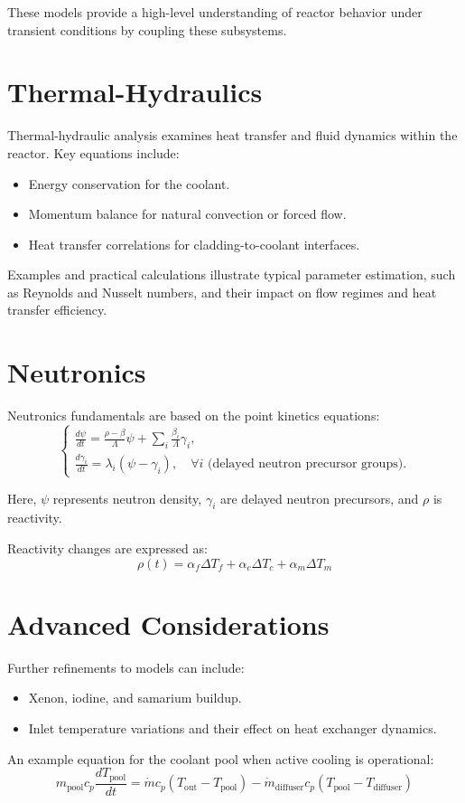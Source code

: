 These models provide a high-level understanding of reactor behavior under transient conditions by coupling these subsystems.

\section{Thermal-Hydraulics}

Thermal-hydraulic analysis examines heat transfer and fluid dynamics within the reactor. Key equations include:
\begin{itemize}
    \item Energy conservation for the coolant.
    \item Momentum balance for natural convection or forced flow.
    \item Heat transfer correlations for cladding-to-coolant interfaces.
\end{itemize}

Examples and practical calculations illustrate typical parameter estimation, such as Reynolds and Nusselt numbers, and their impact on flow regimes and heat transfer efficiency.

\section{Neutronics}

Neutronics fundamentals are based on the point kinetics equations:
\[
\begin{cases}
\frac{d\psi}{dt} = \frac{\rho - \beta}{\Lambda} \psi + \sum_i \frac{\beta_i}{\Lambda} \gamma_i, \\[10pt]
\frac{d\gamma_i}{dt} = \lambda_i (\psi - \gamma_i), \quad \forall i \text{ (delayed neutron precursor groups)}.
\end{cases}
\]

Here, $\psi$ represents neutron density, $\gamma_i$ are delayed neutron precursors, and $\rho$ is reactivity.

Reactivity changes are expressed as:
\[
\rho(t) = \alpha_f \Delta T_f + \alpha_c \Delta T_c + \alpha_m \Delta T_m
\]

\section{Advanced Considerations}

Further refinements to models can include:
\begin{itemize}
    \item Xenon, iodine, and samarium buildup.
    \item Inlet temperature variations and their effect on heat exchanger dynamics.
\end{itemize}
An example equation for the coolant pool when active cooling is operational:
\[
m_{\text{pool}} c_p \frac{dT_{\text{pool}}}{dt} = \dot{m} c_p (T_{\text{out}} - T_{\text{pool}}) - \dot{m}_{\text{diffuser}} c_p (T_{\text{pool}} - T_{\text{diffuser}})
\]

